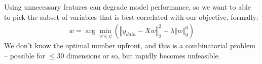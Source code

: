 Using unnecessary features can degrade model performance, so we want to able to pick the subset of variables that is best correlated with our objective, formally:
\begin{align*}
w=\arg\min_{w\in \mathbb{d}}\left(\left\Vert y_{data} -  Xw \right\Vert_{2}^{2} + \lambda\left\Vert w \right\Vert^{0}_{0} \right)
\end{align*}
\pause{}
We don't know the optimal number upfront, and  this is a combinatorial problem -- possible for $\leq 30$ dimensions or so, but rapidly becomes unfeasible.
